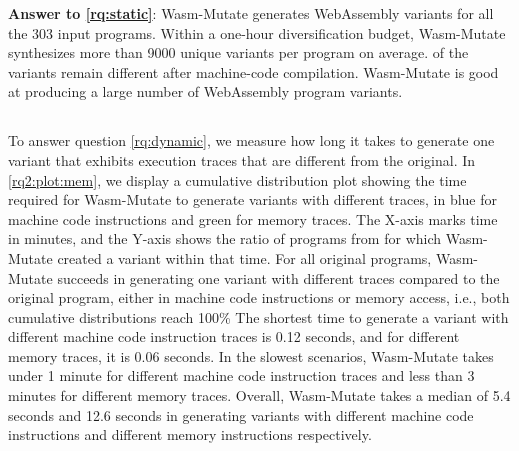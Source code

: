\documentclass[a4paper,fleqn]{cas-dc}
\newcommand*\badge[1]{ \colorbox{red}{\color{white}#1}}
\newcommand{\tool}{{\sc Wasm-Mutate}\xspace}
\newcommand{\Wasm}{WebAssembly\xspace}
\newcommand{\wasm}{\Wasm}
\newcommand{\todo}[1]{%
\refstepcounter{todo}
\noindent\textbf{\badge{TODO}} {\color{red}#1}
\addcontentsline{td}{todo}
{\color{red}\thesection.\thetodo\xspace #1}}
\begin{document}






\begin{tcolorbox}[boxrule=1pt,arc=.3em,boxsep=-1.3mm]
  \textbf{Answer to \ref{rq:static}}: \tool generates \wasm variants for all the 303 input programs. 
  Within a one-hour diversification budget, \tool synthesizes more than 9000 unique  variants per program on average. 
  \preserved of the variants remain different after machine-code compilation.
  \tool is good at producing a large number of \Wasm program variants.
\end{tcolorbox}


\subsection{\rqdynamic}


To answer question \ref{rq:dynamic},   we measure how long it takes to generate one variant that exhibits execution traces that are different from the original.
In \autoref{rq2:plot:mem}, we display a cumulative distribution plot showing the time required for \tool to generate variants with different traces, in blue for machine code instructions and green for memory traces.
The X-axis marks time in minutes, and the Y-axis shows the ratio of programs from \nProgramsRosetta for which \tool created a variant within that time.
For all original programs, \tool succeeds in  generating one variant with different traces compared to the original program, either in machine code instructions or memory access, i.e., both cumulative distributions reach 100\%
The shortest time to generate a variant with different machine code instruction traces is 0.12 seconds, and for different memory traces, it is 0.06 seconds. 
In the slowest scenarios, \tool takes under 1 minute for different machine code instruction traces and less than 3 minutes for different memory traces.
Overall, \tool takes a median of 5.4 seconds and 12.6 seconds in generating variants with different machine code instructions and different memory instructions respectively.
\end{document}
